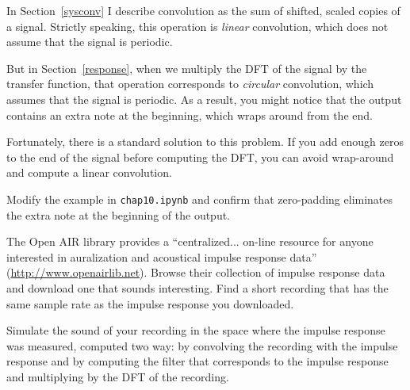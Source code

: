 \begin{exercise}
	In Section~\ref{sysconv} I describe convolution as the sum of shifted,
	scaled copies of a signal.  Strictly speaking, this operation is
	{\em linear} convolution, which does not assume that the signal
	is periodic.
	
	But in Section~\ref{response}, when we multiply the
	DFT of the signal by the transfer function, that operation corresponds
	to {\em circular} convolution, which assumes that the signal is
	periodic.  As a result, you might notice that the output contains
	an extra note at the beginning, which wraps around from the end.
	
	Fortunately, there is a standard solution to this problem.  If you
	add enough zeros to the end of the signal before computing the DFT,
	you can avoid wrap-around and compute a linear convolution.
	
	Modify the example in {\tt chap10.ipynb} and confirm that zero-padding
	eliminates the extra note at the beginning of the output.
\end{exercise}


\begin{exercise}
	The Open AIR library provides a ``centralized... on-line resource for
	anyone interested in auralization and acoustical impulse response
	data'' (\url{http://www.openairlib.net}).  Browse their collection
	of impulse response data and download one that sounds interesting.
	Find a short recording that has the same sample rate as the impulse
	response you downloaded.
	
	Simulate the sound of your recording in the space where the impulse
	response was measured, computed two way: by convolving the recording
	with the impulse response and by computing the filter that corresponds
	to the impulse response and multiplying by the DFT of the recording.
\end{exercise}

